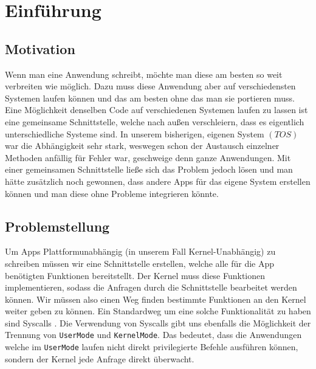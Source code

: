 \section{Einführung}

\subsection{Motivation}
    Wenn man eine Anwendung schreibt, möchte man diese am besten so weit verbreiten wie möglich. Dazu muss diese Anwendung aber auf verschiedensten Systemen laufen können und das am besten ohne das man sie portieren muss. Eine Möglichkeit denselben Code auf verschiedenen Systemen laufen zu lassen ist eine gemeinsame Schnittstelle, welche nach außen verschleiern, dass es eigentlich unterschiedliche Systeme sind. \newline
    In unserem bisherigen, eigenen System $(TOS)$ war die Abhängigkeit sehr stark, weswegen schon der Austausch einzelner Methoden anfällig für Fehler war, geschweige denn ganze Anwendungen. Mit einer gemeinsamen Schnittstelle ließe sich das Problem jedoch lösen und man hätte zusätzlich noch gewonnen, dass andere Apps für das eigene System erstellen können und man diese ohne Probleme integrieren könnte.

\subsection{Problemstellung}
    Um Apps Plattformunabhängig (in unserem Fall Kernel-Unabhängig) zu schreiben müssen wir eine Schnittstelle erstellen, welche alle für die App benötigten Funktionen bereitstellt. Der Kernel muss diese Funktionen implementieren, sodass die Anfragen durch die Schnittstelle bearbeitet werden können. Wir müssen also einen Weg finden bestimmte Funktionen an den Kernel weiter geben zu können. Ein Standardweg um eine solche Funktionalität zu haben sind Syscalls \cite{syscalls-osdev}. Die Verwendung von Syscalls gibt uns ebenfalls die Möglichkeit der Trennung von \verb|UserMode| und \verb|KernelMode|. Das bedeutet, dass die Anwendungen welche im \verb|UserMode| laufen nicht direkt privilegierte Befehle ausführen können, sondern der Kernel jede Anfrage direkt überwacht.